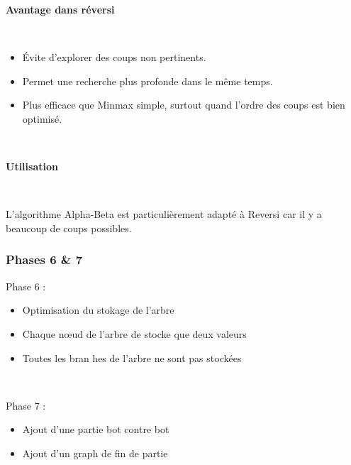 \documentclass[9pt]{beamer}
\begin{document}
\begin{frame}
  \textbf{Avantage dans réversi}
  
  ~

  \begin{itemize}
    \item Évite d’explorer des coups non pertinents.
    \item Permet une recherche plus profonde dans le même temps.
    \item Plus efficace que Minmax simple, surtout quand l’ordre des coups est bien optimisé.
  \end{itemize}

  ~


  \textbf{Utilisation}

  ~

  L’algorithme Alpha-Beta est particulièrement adapté à Reversi car il y a beaucoup de coups possibles.
\end{frame}

\begin{frame}
  \frametitle{Phases 6 \& 7}
  Phase 6 :
  \begin{itemize}
    \item Optimisation du stokage de l'arbre
    \item Chaque nœud de l'arbre de stocke que deux valeurs
    \item Toutes les bran hes de l'arbre ne sont pas stockées
  \end{itemize}

  ~

  Phase 7 :
  \begin{itemize}
    \item Ajout d'une partie bot contre bot
    \item Ajout d'un graph de fin de partie 
  \end{itemize}
\end{frame}
\end{document}
